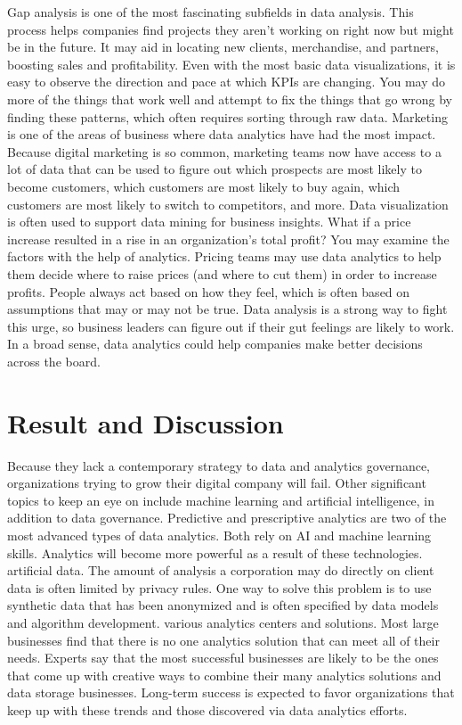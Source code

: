 \documentclass[journal]{IEEEtran}
\begin{document}
\par Gap analysis is one of the most fascinating subfields in data analysis. This process helps companies find projects they aren't working on right now but might be in the future. It may aid in locating new clients, merchandise, and partners, boosting sales and profitability. Even with the most basic data visualizations, it is easy to observe the direction and pace at which KPIs are changing. You may do more of the things that work well and attempt to fix the things that go wrong by finding these patterns, which often requires sorting through raw data. Marketing is one of the areas of business where data analytics have had the most impact. Because digital marketing is so common, marketing teams now have access to a lot of data that can be used to figure out which prospects are most likely to become customers, which customers are most likely to buy again, which customers are most likely to switch to competitors, and more. Data visualization is often used to support data mining for business insights. What if a price increase resulted in a  rise in an organization's total profit? You may examine the factors with the help of analytics. Pricing teams may use data analytics to help them decide where to raise prices (and where to cut them) in order to increase profits. People always act based on how they feel, which is often based on assumptions that may or may not be true. Data analysis is a strong way to fight this urge, so business leaders can figure out if their gut feelings are likely to work. In a broad sense, data analytics could help companies make better decisions across the board.

\section{Result and Discussion }

\par Because they lack a contemporary strategy to data and analytics governance, organizations trying to grow their digital company will fail. Other significant topics to keep an eye on include machine learning and artificial intelligence, in addition to data governance. Predictive and prescriptive analytics are two of the most advanced types of data analytics. Both rely on AI and machine learning skills. Analytics will become more powerful as a result of these technologies. artificial data. The amount of analysis a corporation may do directly on client data is often limited by privacy rules. One way to solve this problem is to use synthetic data that has been anonymized and is often specified by data models and algorithm development. various analytics centers and solutions. Most large businesses find that there is no one analytics solution that can meet all of their needs. Experts say that the most successful businesses are likely to be the ones that come up with creative ways to combine their many analytics solutions and data storage businesses. Long-term success is expected to favor organizations that keep up with these trends and those discovered via data analytics efforts.
\end{document}
